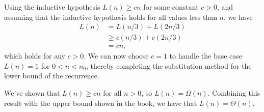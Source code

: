 Using the inductive hypothesis $L(n)\ge cn$ for some constant $c>0$, and assuming that the inductive hypothesis holds for all values less than $n$, we have
\begin{align*}
    L(n) &= L(n/3)+L(2n/3) \\
    &\ge c(n/3)+c(2n/3) \\
    &= cn,
\end{align*}
which holds for any $c>0$.
We can now choose $c=1$ to handle the base case $L(n)=1$ for $0<n<n_0$, thereby completing the substitution method for the lower bound of the recurrence.

We've shown that $L(n)\ge cn$ for all $n>0$, so $L(n)=\Omega(n)$.
Combining this result with the upper bound shown in the book, we have that $L(n)=\Theta(n)$.
